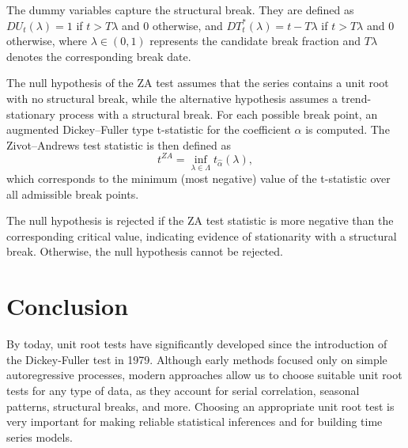 \documentclass[12pt]{article}
\begin{document}
\vspace{0.75cm}

The dummy variables capture the structural break. They are defined as \(DU_t(\lambda)=1\) if \(t > T\lambda\) and 0 otherwise, and \(DT_t^{*}(\lambda)=t - T\lambda\) if \(t > T\lambda\) and 0 otherwise, where \(\lambda \in (0,1)\) represents the candidate break fraction and \(T\lambda\) denotes the corresponding break date.

\vspace{0.75cm}

The null hypothesis of the ZA test assumes that the series contains a unit root with no structural break, while the alternative hypothesis assumes a trend-stationary process with a structural break. For each possible break point, an augmented Dickey--Fuller type t-statistic for the coefficient \(\alpha\) is computed. The Zivot--Andrews test statistic is then defined as
\[
t^{ZA} = \inf_{\lambda \in \Lambda} t_{\hat{\alpha}}(\lambda),
\]
which corresponds to the minimum (most negative) value of the t-statistic over all admissible break points.

\vspace{0.75cm}

The null hypothesis is rejected if the ZA test statistic is more negative than the corresponding critical value, indicating evidence of stationarity with a structural break. Otherwise, the null hypothesis cannot be rejected.
	
	\section{Conclusion}
	
	By today, unit root tests have significantly developed since the introduction of the Dickey-Fuller test in 1979. Although early methods focused only on simple autoregressive processes, modern approaches allow us to choose suitable unit root tests for any type of data, as they account for serial correlation, seasonal patterns, structural breaks, and more. Choosing an appropriate unit root test is very important for making reliable statistical inferences and for building time series models.
	
\end{document}
